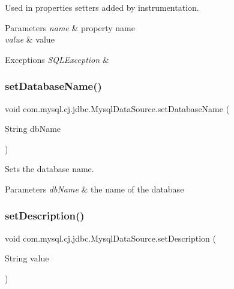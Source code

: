 Used in properties setters added by instrumentation.


\begin{DoxyParams}{Parameters}
{\em name} & property name \\
\hline
{\em value} & value \\
\hline
\end{DoxyParams}

\begin{DoxyExceptions}{Exceptions}
{\em S\+Q\+L\+Exception} & \\
\hline
\end{DoxyExceptions}
\mbox{\label{classcom_1_1mysql_1_1cj_1_1jdbc_1_1_mysql_data_source_a61c38c590ddffdefc2eca544a68beb09}} 
\subsubsection{\texorpdfstring{set\+Database\+Name()}{setDatabaseName()}}
{\footnotesize\ttfamily void com.\+mysql.\+cj.\+jdbc.\+Mysql\+Data\+Source.\+set\+Database\+Name (\begin{DoxyParamCaption}\item[{String}]{db\+Name }\end{DoxyParamCaption})}

Sets the database name.


\begin{DoxyParams}{Parameters}
{\em db\+Name} & the name of the database \\
\hline
\end{DoxyParams}
\mbox{\label{classcom_1_1mysql_1_1cj_1_1jdbc_1_1_mysql_data_source_a953b80b5083953434de23b4b7853d684}} 
\subsubsection{\texorpdfstring{set\+Description()}{setDescription()}}
{\footnotesize\ttfamily void com.\+mysql.\+cj.\+jdbc.\+Mysql\+Data\+Source.\+set\+Description (\begin{DoxyParamCaption}\item[{String}]{value }\end{DoxyParamCaption})}

